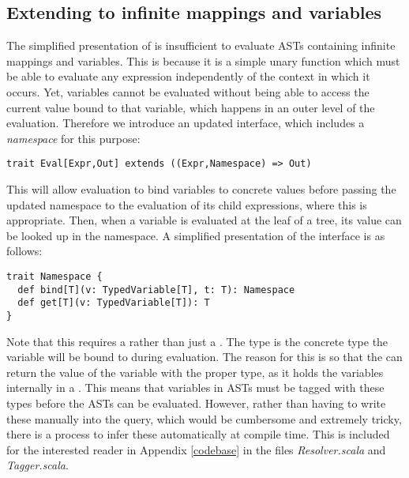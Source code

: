 \subsection{Extending to infinite mappings and variables}
The simplified presentation of  is insufficient to evaluate ASTs containing infinite mappings and variables. This is because it is a simple unary function which must be able to evaluate any expression independently of the context in which it occurs. Yet, variables cannot be evaluated without being able to access the current value bound to that variable, which happens in an outer level of the evaluation.
Therefore we introduce an updated interface, which includes a \textit{namespace} for this purpose:
\vs\begin{lstlisting}
trait Eval[Expr,Out] extends ((Expr,Namespace) => Out)
\end{lstlisting}\vs
This will allow evaluation to bind variables to concrete values before passing the updated namespace to the evaluation of its child expressions, where this is appropriate. Then, when a variable is evaluated at the leaf of a tree, its value can be looked up in the namespace. A simplified presentation of the  interface is as follows:
\vs\begin{lstlisting}
trait Namespace {
  def bind[T](v: TypedVariable[T], t: T): Namespace
  def get[T](v: TypedVariable[T]): T
}
\end{lstlisting}\vs
Note that this requires a  rather than just a . The type  is the concrete type the variable will be bound to during evaluation. The reason for this is so that the  can return the value of the variable with the proper type, as it holds the variables internally in a . This means that variables in ASTs must be tagged with these types before the ASTs can be evaluated. However, rather than having to write these manually into the query, which would be cumbersome and extremely tricky, there is a process to infer these automatically at compile time. This is included for the interested reader in Appendix \ref{codebase} in the files \textit{Resolver.scala} and \textit{Tagger.scala}.

